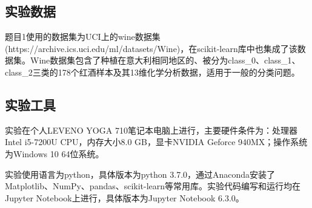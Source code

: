 \documentclass[12pt]{article}
\begin{document}
               
      
\subsection{实验数据}
题目1使用的数据集为UCI上的wine数据集(https://archive.ics.uci.edu/ml/datasets/Wine)，在scikit-learn库中也集成了该数据集。Wine数据集包含了种植在意大利相同地区的、被分为class\_0、class\_1、class\_2三类的178个红酒样本及其13维化学分析数据，适用于一般的分类问题。


\subsection{实验工具}
实验在个人LEVENO YOGA 710笔记本电脑上进行，主要硬件条件为：处理器Intel i5-7200U CPU，内存大小8.0 GB，显卡NVIDIA Geforce 940MX；操作系统为Windows 10 64位系统。\par 
实验使用语言为python，具体版本为python 3.7.0，通过Anaconda安装了Matplotlib、NumPy、pandas、scikit-learn等常用库。实验代码编写和运行均在Jupyter Notebook上进行，具体版本为Jupyter Notebook 6.3.0。
\end{document}
